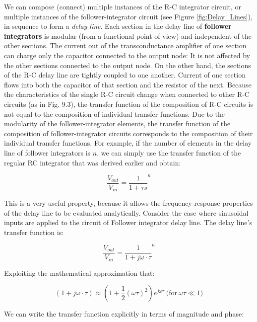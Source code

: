 We can compose (connect) multiple instances of the R-C integrator circuit, or multiple instances of the follower-integrator circuit (see Figure \ref{fig:Delay_Lines}), in sequence to form a \textit{delay line}.
Each section in the delay line of \textbf{follower integrators} is modular (from a functional
point of view) and independent of the other sections. The current out of
the transconductance amplifier of one section can charge only the capacitor
connected to the output node: It is not affected by the other sections connected
to the output node. On the other hand, the sections of the R-C delay line
are tightly coupled to one another. Current of one section flows into
both the capacitor of that section and the resistor of the next. Because the
characteristics of the single R-C circuit change when connected to other R-C
circuits (as in Fig. 9.3), the transfer function of the composition of R-C circuits
is not equal to the composition of individual transfer functions. Due to the modularity of the follower-integrator elements, the transfer function of the composition of follower-integrator circuits corresponds to the
composition of their individual transfer functions. For example, if the number of elements in the delay line of follower integrators is $n$, we can simply use the transfer function of the regular RC integrator that was derived earlier and obtain: 

\begin{equation}
    \frac{V_{out}}{V_{in}} = \frac{1}{1 + \tau s}^n
\end{equation}


This is a very useful property, because it allows the frequency response
properties of the delay line to be evaluated analytically. Consider the case
where sinusoidal inputs are applied to the circuit of Follower integrator delay line. The delay line’s transfer function is:

\begin{equation}
    \frac{V_{out}}{V_{in}} = \frac{1}{1 + j\omega \cdot \tau}^n
\end{equation}

Exploiting the mathematical approximation that: 

\begin{equation}
    (1 + j \omega \cdot \tau) \approx (1 + \frac{1}{2}(\omega \tau)^2)e^{j \omega \tau} \mathrm{\ (for }\ \omega \tau \ll 1)
\end{equation}

We can write the transfer function explicitly in terms of magnitude and phase: 

